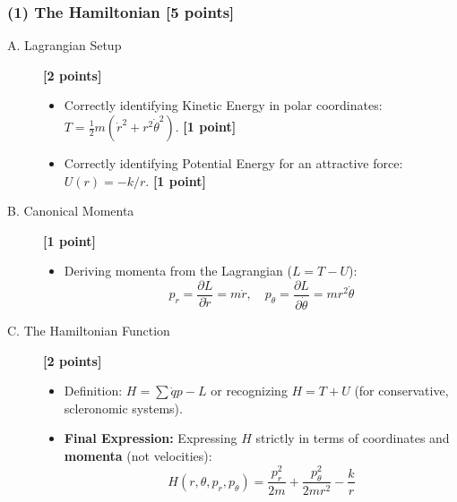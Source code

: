 \documentclass[11pt, a4paper]{article} %
\begin{document}
\subsubsection*{(1) The Hamiltonian [5 points]}
\begin{description}
    \item[A. Lagrangian Setup] \hfill \textbf{[2 points]}
    \begin{itemize}
        \item Correctly identifying Kinetic Energy in polar coordinates: $T = \frac{1}{2}m(\dot{r}^2 + r^2\dot{\theta}^2)$. \textbf{[1 point]}
        \item Correctly identifying Potential Energy for an attractive force: $U(r) = -k/r$. \textbf{[1 point]}
    \end{itemize}

    \item[B. Canonical Momenta] \hfill \textbf{[1 point]}
    \begin{itemize}
        \item Deriving momenta from the Lagrangian ($L=T-U$):
        \[ p_r = \frac{\partial L}{\partial \dot{r}} = m\dot{r}, \quad p_\theta = \frac{\partial L}{\partial \dot{\theta}} = mr^2\dot{\theta} \]
    \end{itemize}

    \item[C. The Hamiltonian Function] \hfill \textbf{[2 points]}
    \begin{itemize}
        \item Definition: $H = \sum \dot{q}p - L$ or recognizing $H = T+U$ (for conservative, scleronomic systems).
        \item \textbf{Final Expression:} Expressing $H$ strictly in terms of coordinates and \textbf{momenta} (not velocities):
        \[ H(r, \theta, p_r, p_\theta) = \frac{p_r^2}{2m} + \frac{p_\theta^2}{2mr^2} - \frac{k}{r} \]
    \end{itemize}
\end{description}
\end{document}
